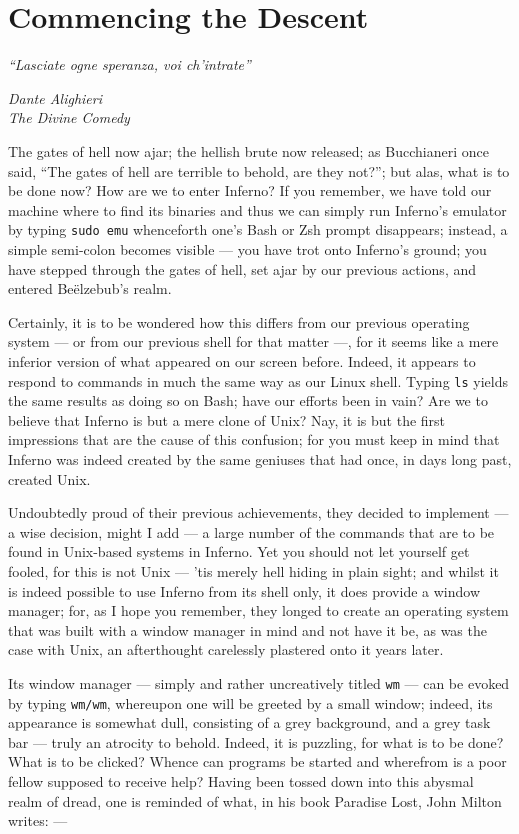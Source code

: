 \documentclass[a5paper,twoside,12pt]{report}
\begin{document}
\chapter*{Commencing the Descent}
  
  \epigraph{\textit{``Lasciate ogne speranza, voi ch'intrate''}}{\textit{Dante Alighieri\\The Divine Comedy}}

  The gates of hell now ajar; the hellish brute now released; as Bucchianeri once said, ``The gates of hell are terrible to behold, are they not?''; but alas, what is to be done now? How are we to enter Inferno? If you remember, we have told our machine where to find its binaries and thus we can simply run Inferno's emulator by typing \texttt{sudo emu} whenceforth one's Bash or Zsh prompt disappears; instead, a simple semi-colon becomes visible — you have trot onto Inferno's ground; you have stepped through the gates of hell, set ajar by our previous actions, and entered Be\"{e}lzebub's realm.

  Certainly, it is to be wondered how this differs from our previous operating system — or from our previous shell for that matter —, for it seems like a mere inferior version of what appeared on our screen before. Indeed, it appears to respond to commands in much the same way as our Linux shell. Typing \texttt{ls} yields the same results as doing so on Bash; have our efforts been in vain? Are we to believe that Inferno is but a mere clone of Unix? Nay, it is but the first impressions that are the cause of this confusion; for you must keep in mind that Inferno was indeed created by the same geniuses that had once, in days long past, created Unix.

  Undoubtedly proud of their previous achievements, they decided to implement — a wise decision, might I add — a large number of the commands that are to be found in Unix-based systems in Inferno. Yet you should not let yourself get fooled, for this is not Unix — 'tis merely hell hiding in plain sight; and whilst it is indeed possible to use Inferno from its shell only, it does provide a window manager; for, as I hope you remember, they longed to create an operating system that was built with a window manager in mind and not have it be, as was the case with Unix, an afterthought carelessly plastered onto it years later.

	Its window manager — simply and rather uncreatively titled \texttt{wm} — can be evoked by typing \texttt{wm/wm}, whereupon one will be greeted by a small window; indeed, its appearance is somewhat dull, consisting of a grey background, and a grey task bar — truly an atrocity to behold. Indeed, it is puzzling, for what is to be done? What is to be clicked? Whence can programs be started and wherefrom is a poor fellow supposed to receive help? Having been tossed down into this abysmal realm of dread, one is reminded of what, in his book Paradise Lost, John Milton writes: —
\end{document}

